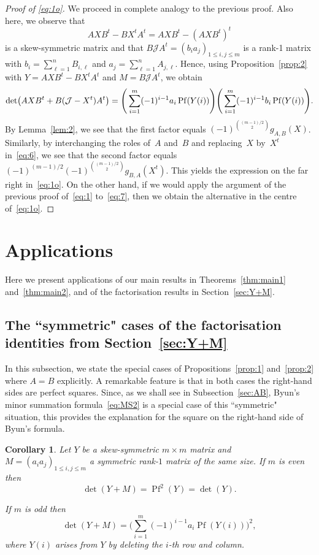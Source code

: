 \documentclass[12pt,reqno]{amsart}
\numberwithin{equation}{section}
\newtheorem{corollary}[theorem]{Corollary}
\theoremstyle{definition}
\theoremstyle{remark}
\def\Pf{\operatorname{Pf}}
\def\J{\mathcal J}
\begin{document}
\begin{proof}[Proof of \eqref{eq:1o}]
We proceed in complete analogy to the previous proof.
Also here, we observe that
$$AXB^t-BX^tA^t=AXB^t-(AXB^t)^t$$
is a skew-symmetric matrix and that
$B\J A^t=(b_ia_j)_{1\le i,j\le m}$ is a rank-1 matrix with
$b_i=\sum_{\ell=1}^nB_{i,\ell}$ and
$a_j=\sum_{\ell=1}^nA_{j,\ell}$.
Hence,
using Proposition~\ref{prop:2} with $Y=AXB^t-BX^tA^t$
and $M=B\J A^t$, we obtain
\begin{equation} \label{eq:7}
\det\bigl(AXB^t+B(\J -X^t)A^t\bigr)\\
=\Bigg(
\sum_{i=1}^m(-1)^{i-1}a_i
\Pf(Y(i))\Bigg)\Bigg(
\sum_{i=1}^m(-1)^{i-1}b_i
\Pf(Y(i))\Bigg).
\end{equation}
By Lemma~\ref{lem:2}, we see that the first factor equals
$(-1)^{\binom {(m-1)/2}2}g_{A,B}(X)$. Similarly, by interchanging the
roles of~$A$ and~$B$ and replacing~$X$ by~$X^t$ in~\eqref{eq:6},
we see that the second factor equals
$(-1)^{(m-1)/2}(-1)^{\binom {(m-1)/2}2}g_{B,A}(X^t)$. This yields the
expression on the far right in~\eqref{eq:1o}.
On the other hand, if we would apply the argument of the previous
proof of~\eqref{eq:1} to~\eqref{eq:7}, then we obtain the alternative
in the centre of~\eqref{eq:1o}.
\end{proof}

\section{Applications}
\label{sec:appl}

Here we present applications of our main results in
Theorems~\ref{thm:main1} and~\ref{thm:main2}, and of the factorisation
results in Section~\ref{sec:Y+M}.

\subsection{The ``symmetric" cases of the factorisation identities from
Section~\ref{sec:Y+M}}
\label{sec:sym}

In this subsection, we state the special cases of
Propositions~\ref{prop:1} and~\ref{prop:2} where $A=B$ explicitly. 
A remarkable feature is that in both cases the right-hand sides
are perfect squares. Since, as we shall see in
Subsection~\ref{sec:AB}, Byun's minor summation
formula~\eqref{eq:MS2} is a special
case of this ``symmetric" situation, this provides the explanation for
the square on the right-hand side of Byun's formula.

\begin{corollary} \label{cor:5}
Let $Y$ be a skew-symmetric $m\times m$ matrix and
$M=(a_ia_j)_{1\le i,j\le m}$ a symmetric
rank-$1$ matrix of the same size.
If $m$ is even then
$$
\det(Y+M)=\Pf^2(Y)=\det(Y).
$$

If $m$ is odd then
$$
\det(Y+M)=\Bigg(
\sum_{i=1}^m(-1)^{i-1}a_i      
\Pf(Y(i))\Bigg)^2,
$$
where $Y(i)$ arises from $Y$ by deleting the $i$-th
row and column.
\end{corollary}
\end{document}
